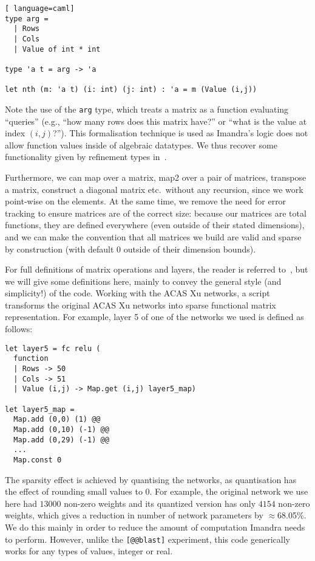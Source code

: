 \documentclass[runningheads]{llncs}
\newcommand{\knote}[1]{\todo[inline, color=blue!20]{#1}}
\begin{document}
\begin{lstlisting}[ language=caml]
type arg =
  | Rows
  | Cols
  | Value of int * int

type 'a t = arg -> 'a

let nth (m: 'a t) (i: int) (j: int) : 'a = m (Value (i,j))
\end{lstlisting}

Note the use of the \lstinline{arg} type, which treats a matrix as a function evaluating ``queries'' (e.g., ``how many rows does this matrix have?'' or ``what is the value at index $(i,j)$?''). This formalisation technique is used as Imandra's logic does not allow function values inside of algebraic datatypes. %
We thus recover some functionality given by refinement types in~\cite{KokkeKKAA20}.  

Furthermore, we can map over a matrix, map2 over a pair of matrices, transpose a
matrix, construct a diagonal matrix etc.\ without any recursion, since we work
point-wise on the elements. At the same time, we remove the need for error
tracking to ensure matrices are of the correct size: because our matrices are
total functions, they are defined everywhere (even outside of their stated
dimensions), and we can make the convention that all matrices we build are valid
and sparse by construction (with default 0 outside of their dimension bounds).

For full definitions of matrix operations and layers, the reader is referred to~\cite{DPKD22}, but we will give some definitions here, mainly to convey the general style (and simplicity!) of the code.  Working with the ACAS Xu networks, a script transforms the original ACAS Xu networks into sparse functional matrix representation.
For example, layer 5 of one of the networks we used is defined as follows:

\knote{define fc, or say how it is defined}

\begin{lstlisting}[language=caml]
let layer5 = fc relu (
  function
  | Rows -> 50
  | Cols -> 51
  | Value (i,j) -> Map.get (i,j) layer5_map)

let layer5_map =
  Map.add (0,0) (1) @@
  Map.add (0,10) (-1) @@
  Map.add (0,29) (-1) @@
  ...
  Map.const 0
\end{lstlisting}

\noindent The sparsity effect is achieved by quantising the networks, as quantisation has the effect of rounding small values to $0$.
For example, the original network we use here had $13000$ non-zero weights and its quantized version has only $4154$ non-zero weights,
which gives a reduction in number of network parameters by $\approx$68.05\%. 
We do this mainly in order to reduce the amount of computation Imandra needs to perform.
However, unlike the  \lstinline{[@@blast]} experiment, this code  generically works for any types of values, integer or real.
\end{document}
